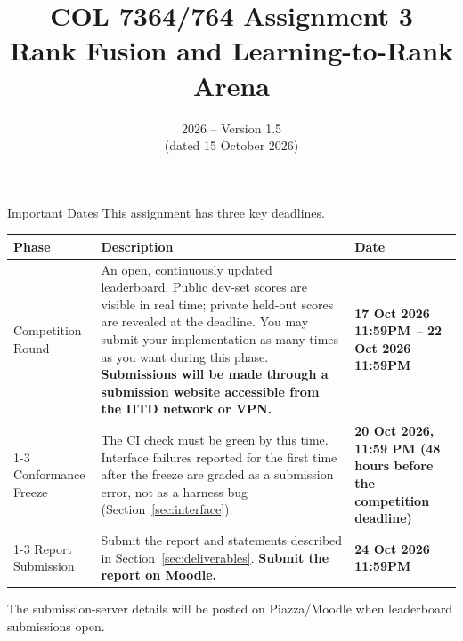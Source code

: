 \documentclass[10pt]{article}
\title{COL 7364/764 Assignment 3\\[2pt] \large Rank Fusion and Learning-to-Rank Arena}
\date{2026 -- Version 1.5\\(dated 15 October 2026)}
\newcommand{\COMPSTART}{\textbf{17 Oct 2026
11:59PM}}
\newcommand{\COMPEND}{\textbf{22 Oct
2026 11:59PM}}
\newcommand{\FREEZE}{\textbf{20 Oct 2026, 11:59 PM (48 hours before the competition deadline)}}
\newcommand{\REPORTDUE}{\textbf{24 Oct 2026 11:59PM}}
\begin{document}
\maketitle

\noindent
\begin{mybox}{Important Dates}
This assignment has three key deadlines.

\begin{center}
\begin{tabular}{l p{8cm} p{3cm}}
\toprule
\textbf{Phase} & \textbf{Description} & \textbf{Date}\\
\midrule
Competition Round &
An open, continuously updated leaderboard. Public dev-set scores are visible in real time; private held-out scores are revealed at the deadline. You may submit your implementation as many times as you want during this phase. \textbf{Submissions will be made through a submission website accessible from the IITD network or VPN.} &
\COMPSTART\ -- \COMPEND\\
\cmidrule(lr){1-3}
Conformance Freeze &
The CI check must be green by this time. Interface failures reported for the first time after the freeze are graded as a submission error, not as a harness bug (Section~\ref{sec:interface}). &
\FREEZE\\
\cmidrule(lr){1-3}
Report Submission &
Submit the report and statements described in Section~\ref{sec:deliverables}. \textbf{Submit the report on Moodle.} &
\REPORTDUE\\
\bottomrule
\end{tabular}
\end{center}

The submission-server details will be posted on Piazza/Moodle when leaderboard submissions open.
\end{mybox}
\end{document}
